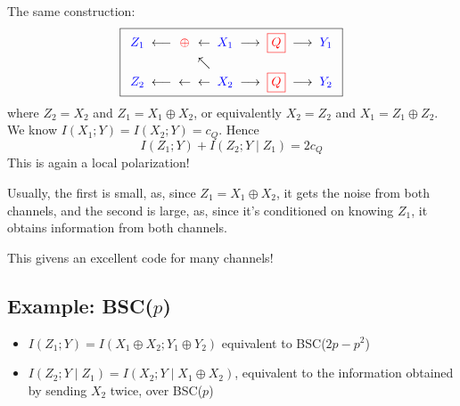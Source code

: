 \documentclass{article}
\begin{document}
The same construction:
\[
\boxed{
\renewcommand{\arraystretch}{1.3}
\begin{array}{c@{\;\;}c@{\;\;}c@{\;\;}c@{\;\;}c@{\;\;}c@{\;\;}c@{\;\;}c@{\;\;}c}
{\color{blue}Z_1} & \longleftarrow & {\color{red}\oplus} & \leftarrow & {\color{blue}X_1} & \longrightarrow & {\color{red}\boxed{Q}} & \longrightarrow & {\color{blue}Y_1} \\
 & & & \nwarrow & & & & & \\
{\color{blue}Z_2} & \longleftarrow & \leftarrow & \leftarrow & {\color{blue}X_2} & \longrightarrow & {\color{red}\boxed{Q}} & \longrightarrow & {\color{blue}Y_2}
\end{array}
}
\]
where $Z_2=X_2$ and $Z_1=X_1\oplus X_2$, or equivalently $X_2=Z_2$ and $X_1= Z_1\oplus Z_2$. We know $I(X_1;Y)=I(X_2; Y)=c_Q$. Hence 
\[
I(Z_1;Y) + I(Z_2; Y\mid Z_1) = 2c_Q
\]
This is again a local polarization!

Usually, the first is small, as, since $Z_1=X_1\oplus X_2$, it gets the noise from both channels, and the second is large, as, since it's conditioned on knowing $Z_1$, it obtains information from both channels.

This givens an excellent code for many channels!

\subsection{Example: BSC($p$)}
\begin{itemize}
    \item $I(Z_1; Y)= I(X_1\oplus X_2;Y_1\oplus Y_2)$ equivalent to BSC($2p-p^2$)
    \item $I(Z_2; Y\mid Z_1) = I(X_2; Y\mid X_1\oplus X_2)$, equivalent to the information obtained by sending $X_2$ twice, over BSC($p$)
\end{itemize}
\end{document}
